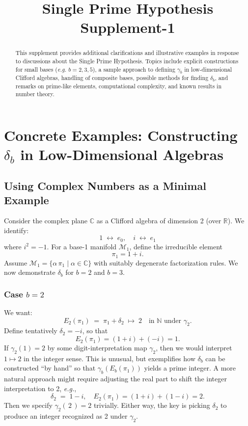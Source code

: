 \documentclass[11pt]{article}
\begin{document}
\title{\textbf{Single Prime Hypothesis Supplement-1}}
\author{}
\date{}
\maketitle

\begin{abstract}
This supplement provides additional clarifications and illustrative examples in response to
discussions about the Single Prime Hypothesis. Topics include explicit constructions for 
small bases (\emph{e.g.} $b=2,3,5$), a sample approach to defining $\gamma_b$ in low-dimensional
Clifford algebras, handling of composite bases, possible methods for finding $\delta_b$,
and remarks on prime-like elements, computational complexity, and known results in number theory.
\end{abstract}

\section{Concrete Examples: Constructing \texorpdfstring{$\delta_b$}{db} in Low-Dimensional Algebras}

\subsection{Using Complex Numbers as a Minimal Example}
\label{sec:ComplexExample}
Consider the complex plane $\mathbb{C}$ as a Clifford algebra of dimension 2 
(over $\mathbb{R}$). We identify:
\[
  1 \;\leftrightarrow\; e_0, 
  \quad i \;\leftrightarrow\; e_1
\]
where $i^2=-1$. For a base-1 manifold $\mathcal{M}_1$, define 
the irreducible element 
\[
  \pi_1 = 1 + i.
\]
Assume $\mathcal{M}_1 = \{\alpha\,\pi_1 \mid \alpha \in \mathbb{C}\}$ 
with suitably degenerate factorization rules. We now demonstrate 
$\delta_b$ for $b=2$ and $b=3$.

\subsubsection{Case \texorpdfstring{$b=2$}{b=2}}
We want:
\[
  E_2(\pi_1) \;=\; \pi_1 + \delta_2 
  \;\mapsto\; 2 \quad \text{in } \mathbb{N} \text{ under } \gamma_2.
\]
Define tentatively $\delta_2 = -i$, so that
\[
  E_2(\pi_1) = (1 + i) + (-i) = 1.
\]
If $\gamma_2(1) = 2$ by some digit-interpretation map $\gamma_2$, 
then we would interpret $1 \mapsto 2$ in the integer sense. 
This is unusual, but exemplifies how $\delta_b$ can be constructed 
``by hand'' so that $\gamma_b(E_b(\pi_1))$ yields a prime integer. 
A more natural approach might require adjusting the real part 
to shift the integer interpretation to 2, \emph{e.g.},
\[
  \delta_2 \;=\; 1 - i,
  \quad
  E_2(\pi_1) = (1 + i) + (1 - i) = 2.
\]
Then we specify $\gamma_2(\,2\,)=2$ trivially. 
Either way, the key is picking $\delta_2$ to produce 
an integer recognized as 2 under $\gamma_2$.
\end{document}
